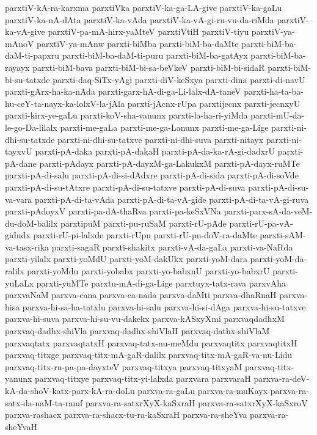{parxtiV-kA-ra-karxma
parxtiVka
parxtiV-ka-ga-LA-give
parxtiV-ka-gaLu
parxtiV-ka-nA-dAta
parxtiV-ka-vAda
parxtiV-ka-vA-gi-ru-vu-da-riMda
parxtiV-ka-vA-give
parxtiV-pa-mA-hirx-yaMteV
parxtiVtiH
parxtiV-tiyu
parxtiV-ya-mAnoV
parxtiV-ya-mAnw
parxti-biMba
parxti-biM-ba-daMte
parxti-biM-ba-daM-ti-papxru
parxti-biM-ba-daM-ti-puru
parxti-biM-ba-gatAyx
parxti-biM-ba-rayayx
parxti-biM-bava
parxti-biM-bi-sa-beVkeV
parxti-biM-bi-sidaR
parxti-biM-bi-su-tatxde
parxti-daq-SiTx-yAgi
parxti-diV-keSxya
parxti-dina
parxti-di-navU
parxti-gArx-ha-ka-nAda
parxti-garx-hA-di-ga-Li-lalx-dA-taneV
parxti-ha-ta-ba-hu-ceY-ta-nayx-ka-lolxV-la-jAla
parxti-jAcnx-rUpa
parxtijecnx
parxti-jecnxyU
parxti-kirx-ye-gaLu
parxti-koV-sha-vanunx
parxti-la-ha-ri-yiMda
parxti-mU-da-le-go-Da-lilalx
parxti-me-gaLa
parxti-me-ga-Lanunx
parxti-me-ga-Lige
parxti-ni-dhi-su-tatxde
parxti-ni-dhi-su-tatxve
parxti-ni-dhi-suva
parxti-nitayx
parxti-ni-tayxvU
parxti-pA-daka
parxti-pA-dakaH
parxti-pA-da-ka-rA-gi-dadxrU
parxti-pA-dane
parxti-pAdayx
parxti-pA-dayxM-ga-LakukxM
parxti-pA-dayx-ruMTe
parxti-pA-di-salu
parxti-pA-di-si-dAdxre
parxti-pA-di-sida
parxti-pA-di-soVde
parxti-pA-di-su-tAtxre
parxti-pA-di-su-tatxve
parxti-pA-di-suva
parxti-pA-di-su-va-vara
parxti-pA-di-ta-vAda
parxti-pA-di-ta-vA-gide
parxti-pA-di-ta-vA-gi-ruva
parxti-pAdoyxV
parxti-pa-dA-thaRva
parxti-pa-keSxVNa
parxti-parx-sA-da-veM-du-doM-balilx
parxtipuM
parxti-pu-ruSaM
parxti-rU-pAde
parxti-rU-pa-vA-gidudx
parxti-rU-pi-lalxde
parxti-rUpu
parxti-rU-pu-doV-ra-daMte
parxti-sAM-va-tasx-rika
parxti-sagaR
parxti-shakitx
parxti-vA-da-gaLa
parxti-va-NaRda
parxti-yilalx
parxti-yoMdU
parxti-yoM-dakUkx
parxti-yoM-dara
parxti-yoM-da-ralilx
parxti-yoMdu
parxti-yobabx
parxti-yo-babxnU
parxti-yo-babxrU
parxti-yuLaLx
parxti-yuMTe
parxtu-mA-di-ga-Lige
parxtuyx-tatx-rava
parxvAha
parxvaNaM
parxva-cana
parxva-ca-nada
parxva-daMti
parxva-dhaRnaH
parxva-hisa
parxva-hi-sa-ha-tatxlu
parxva-hi-salu
parxva-hi-si-dAga
parxva-hi-su-tatxve
parxva-hi-suva
parxva-hi-su-vu-dakekx
parxva-kASxyXmi
parxvaqdadhxM
parxvaq-dadhx-shiVla
parxvaq-dadhx-shiVlaH
parxvaq-dathx-shiVlaM
parxvaqtatx
parxvaqtatxH
parxvaq-tatx-nu-meMdu
parxvaqtitx
parxvaqtitxH
parxvaq-titxge
parxvaq-titx-mA-gaR-dalilx
parxvaq-titx-mA-gaR-va-nu-Lidu
parxvaq-titx-ru-pa-pa-dayxteV
parxvaq-titxya
parxvaq-titxyaM
parxvaq-titx-yanunx
parxvaq-titxye
parxvaq-titx-yi-lalxda
parxvara
parxvaraH
parxva-ra-deV-kA-da-shoV-katx-parx-kA-ra-doLu
parxva-ra-gaLu
parxva-ra-muKayx
parxva-ra-satx-da-naM-ta-ramf
parxva-ra-satxrXyX-kaSxraH
parxva-ra-satxrXyX-kaSxroV
parxva-rashacx
parxva-ra-shacx-tu-ra-kaSxraH
parxva-ra-sheYva
parxva-ra-sheYvaH
}
